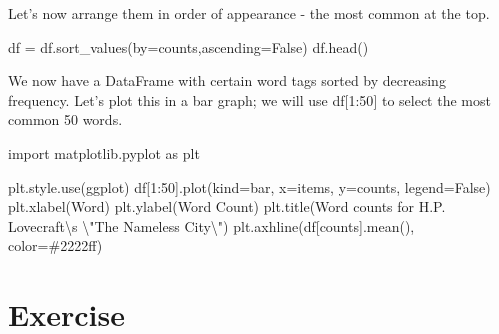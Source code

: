 \documentclass[
  letterpaper,
  DIV=11,
  numbers=noendperiod]{scrreprt}
\newenvironment{Shaded}{\begin{snugshade}}{\end{snugshade}}
\newcommand{\CharTok}[1]{\textcolor[rgb]{0.13,0.47,0.30}{#1}}
\newcommand{\DecValTok}[1]{\textcolor[rgb]{0.68,0.00,0.00}{#1}}
\newcommand{\ImportTok}[1]{\textcolor[rgb]{0.00,0.46,0.62}{#1}}
\newcommand{\NormalTok}[1]{\textcolor[rgb]{0.00,0.23,0.31}{#1}}
\newcommand{\OperatorTok}[1]{\textcolor[rgb]{0.37,0.37,0.37}{#1}}
\newcommand{\StringTok}[1]{\textcolor[rgb]{0.13,0.47,0.30}{#1}}
\newcommand{\VariableTok}[1]{\textcolor[rgb]{0.07,0.07,0.07}{#1}}
\begin{document}
Let's now arrange them in order of appearance - the most common at the
top.

\begin{Shaded}
\begin{Highlighting}[]
\NormalTok{df }\OperatorTok{=}\NormalTok{ df.sort\_values(by}\OperatorTok{=}\StringTok{\textquotesingle{}counts\textquotesingle{}}\NormalTok{,ascending}\OperatorTok{=}\VariableTok{False}\NormalTok{)}
\NormalTok{df.head()}
\end{Highlighting}
\end{Shaded}

We now have a DataFrame with certain word tags sorted by decreasing
frequency. Let's plot this in a bar graph; we will use df{[}1:50{]} to
select the most common 50 words.

\begin{Shaded}
\begin{Highlighting}[]
\ImportTok{import}\NormalTok{ matplotlib.pyplot }\ImportTok{as}\NormalTok{ plt}
\end{Highlighting}
\end{Shaded}

\begin{Shaded}
\begin{Highlighting}[]
\NormalTok{plt.style.use(}\StringTok{\textquotesingle{}ggplot\textquotesingle{}}\NormalTok{)}
\NormalTok{df[}\DecValTok{1}\NormalTok{:}\DecValTok{50}\NormalTok{].plot(kind}\OperatorTok{=}\StringTok{\textquotesingle{}bar\textquotesingle{}}\NormalTok{, x}\OperatorTok{=}\StringTok{\textquotesingle{}items\textquotesingle{}}\NormalTok{, y}\OperatorTok{=}\StringTok{\textquotesingle{}counts\textquotesingle{}}\NormalTok{, legend}\OperatorTok{=}\VariableTok{False}\NormalTok{)}
\NormalTok{plt.xlabel(}\StringTok{\textquotesingle{}Word\textquotesingle{}}\NormalTok{)}
\NormalTok{plt.ylabel(}\StringTok{\textquotesingle{}Word Count\textquotesingle{}}\NormalTok{)}
\NormalTok{plt.title(}\StringTok{\textquotesingle{}Word counts for H.P. Lovecraft}\CharTok{\textbackslash{}\textquotesingle{}}\StringTok{s }\CharTok{\textbackslash{}"}\StringTok{The Nameless City}\CharTok{\textbackslash{}"}\StringTok{\textquotesingle{}}\NormalTok{)}
\NormalTok{plt.axhline(df[}\StringTok{\textquotesingle{}counts\textquotesingle{}}\NormalTok{].mean(), color}\OperatorTok{=}\StringTok{\textquotesingle{}\#2222ff\textquotesingle{}}\NormalTok{)}
\end{Highlighting}
\end{Shaded}

\hypertarget{exercise-10}{%
\section{Exercise}\label{exercise-10}}
\end{document}
